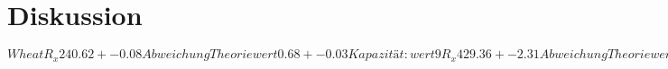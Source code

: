 \section{Diskussion}
\label{sec:Diskussion}

$Wheat R_x 240.62 +- 0.08
Abweichung Theoriewert 0.68 +- 0.03
Kapazität: wert 9 R_x 429.36 +- 2.31
Abweichung Theoriewert 7.64 +- 0.5$ 
